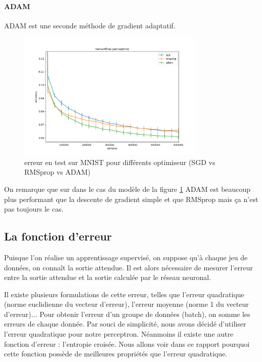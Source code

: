 \paragraph{ADAM}
ADAM est une seconde méthode de gradient adaptatif.

\newpage

\begin{figure}[ht]
 \centering
 \includegraphics[width=0.8\textwidth]{img/sgd_rmsprop_adam.png}
 \caption{erreur en test sur MNIST pour différents optimiseur (SGD vs RMSprop vs ADAM)}
 \label{fig:sgd_rmsprop_adam}
\end{figure}

On remarque que sur dans le cas du modèle de la figure \ref{fig:sgd_rmsprop_adam} ADAM est beaucoup plus performant que la descente de gradient simple et que RMSprop
mais ça n'est pas toujours le cas.


\subsection{La fonction d'erreur}

Puisque l'on réalise un apprentissage supervisé, on suppose qu'à chaque jeu de données, on connaît la sortie attendue. Il est alors nécessaire
de mesurer l'erreur entre la sortie attendue et la sortie calculée par le réseau neuronal.

Il existe plusieurs formulations de cette erreur, telles que l'erreur quadratique (norme euclidienne du vecteur d'erreur), l'erreur moyenne (norme 1 du vecteur d'erreur)... 
Pour obtenir l'erreur d'un groupe de données (batch), on somme les erreurs de chaque donnée. Par souci de simplicité, nous avons décidé d'utiliser
l'erreur quadratique pour notre perceptron. Néanmoins il existe une autre fonction d'erreur : l'entropie croisée. Nous allons voir dans ce rapport pourquoi 
cette fonction possède de meilleures propriétés que l'erreur quadratique.


